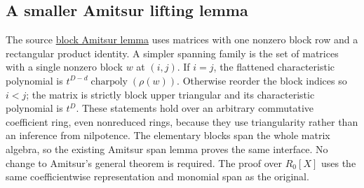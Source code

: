 \documentclass[11pt]{article}
\newcommand{\src}[2]{\href{https://github.com/VladimirReshetnikov/ProveIt/blob/9050b04000647d588d0c78d945180abcd3b0bcf7/Analysis/GeneralizedRiemannHypothesis/Lean/grh/src/#1}{#2}}
\begin{document}
\subsection{A smaller Amitsur lifting lemma}
The source \src{New/Congruences/FirstOrder/RibetMethod.lean\#L51}{block Amitsur lemma} uses matrices with one nonzero block row and a rectangular product identity. A simpler spanning family is the set of matrices with a single nonzero block $w$ at $(i,j)$. If $i=j$, the flattened characteristic polynomial is $t^{D-d}\operatorname{charpoly}(\rho(w))$. Otherwise reorder the block indices so $i<j$; the matrix is strictly block upper triangular and its characteristic polynomial is $t^D$. These statements hold over an arbitrary commutative coefficient ring, even nonreduced rings, because they use triangularity rather than an inference from nilpotence. The elementary blocks span the whole matrix algebra, so the existing Amitsur span lemma proves the same interface. No change to Amitsur's general theorem is required. The proof over $R_0[X]$ uses the same coefficientwise representation and monomial span as the original.
\end{document}
